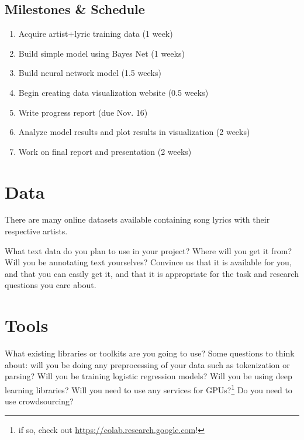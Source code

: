 \documentclass[11pt,a4paper]{article}
\begin{document}
\subsection{Milestones \& Schedule}


\begin{enumerate}
    \item Acquire artist+lyric training data  (1 week)
    \item Build simple model using Bayes Net (1 weeks)
    \item Build neural network model (1.5 weeks)
    \item Begin creating data visualization website (0.5 weeks)
    \item Write progress report (due Nov. 16)
    \item Analyze model results and plot results in visualization (2 weeks)
    \item Work on final report and presentation (2 weeks)
\end{enumerate}

\section{Data}
There are many online datasets available containing song lyrics with their respective artists.

What text data do you plan to use in your project? Where will you get it from? Will you be annotating text yourselves? Convince us that it is available for you, and that you can easily get it, and that it is appropriate for the task and research questions you care about.

\section{Tools}
What existing libraries or toolkits are you going to use? 
Some questions to think about: will you be doing any preprocessing of your data such as tokenization or parsing? 
Will you be training logistic regression models? Will you be using deep learning libraries? 
Will you need to use any services for GPUs?\footnote{if so, check out \url{https://colab.research.google.com}!} 
Do you need to use crowdsourcing?


\footnotesize

\end{document}
